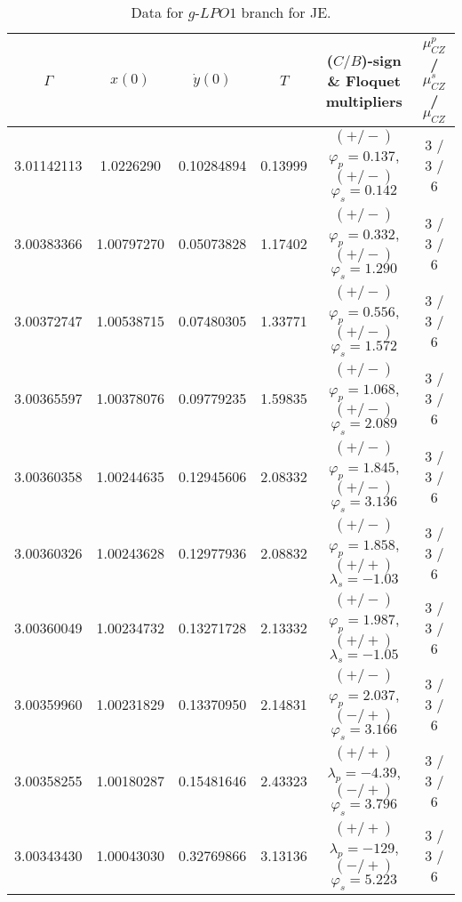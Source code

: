 \documentclass[reqno, 11pt]{amsart}
\theoremstyle{plain}
\theoremstyle{definition}
\theoremstyle{remark}
\begin{document}
\begin{table}[htbp]\fontsize{10}{10}\selectfont \centering
\caption{Data for $g$-$LPO1$ branch for JE.}
\begin{tabular}{c|c|c|c|c|c}
\hline 
	$\Gamma$ & $x(0)$ & $\dot{y}(0)$ & $T$ & ($C/B$)-sign \& Floquet multipliers & $\mu_{CZ}^p$ / $\mu_{CZ}^s$ / $\mu_{CZ}$\\
	\hline 3.01142113 & 1.0226290 & 0.10284894 & 0.13999 & $(+/-)$ $\varphi_p = 0.137$, $(+/-)$ $\varphi_s = 0.142$ & 3 / 3 / 6\\
	3.00383366 & 1.00797270 & 0.05073828 & 1.17402 & $(+/-)$ $\varphi_p = 0.332$, $(+/-)$ $\varphi_s = 1.290$ & 3 / 3 / 6 \\
	3.00372747 & 1.00538715 & 0.07480305 & 1.33771 & $(+/-)$ $\varphi_p = 0.556$, $(+/-)$ $\varphi_s = 1.572$ & 3 / 3 / 6 \\
	3.00365597 & 1.00378076 & 0.09779235 & 1.59835 & $(+/-)$ $\varphi_p = 1.068$, $(+/-)$ $\varphi_s = 2.089$ & 3 / 3 / 6 \\
	3.00360358 & 1.00244635 & 0.12945606 & 2.08332 & $(+/-)$ $\varphi_p = 1.845$, $(+/-)$ $\varphi_s = 3.136$ & 3 / 3 / 6 \\
	3.00360326 & 1.00243628 & 0.12977936 & 2.08832 & $(+/-)$ $\varphi_p = 1.858$, $(+/+)$ $\lambda_s = -1.03$ & 3 / 3 / 6 \\
	3.00360049 & 1.00234732 & 0.13271728 & 2.13332 & $(+/-)$ $\varphi_p = 1.987$, $(+/+)$ $\lambda_s = -1.05$ & 3 / 3 / 6 \\
	3.00359960 & 1.00231829 & 0.13370950 & 2.14831 & $(+/-)$ $\varphi_p = 2.037$, $(-/+)$ $\varphi_s = 3.166$ & 3 / 3 / 6 \\
	3.00358255 & 1.00180287 & 0.15481646 & 2.43323 & $(+/+)$ $\lambda_p = -4.39$, $(-/+)$ $\varphi_s = 3.796$ & 3 / 3 / 6 \\
	3.00343430 & 1.00043030 & 0.32769866 & 3.13136 & $(+/+)$ $\lambda_p = -129$, $(-/+)$ $\varphi_s = 5.223$ & 3 / 3 / 6
\end{tabular}
\label{data_g_lpo1}
\end{table}
\end{document}
